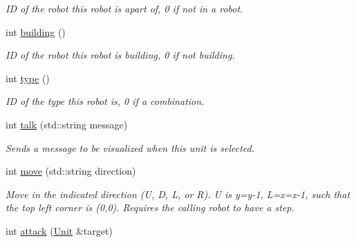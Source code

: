 \begin{DoxyCompactItemize}
\begin{DoxyCompactList}\small\item\em ID of the robot this robot is apart of, 0 if not in a robot. \item\end{DoxyCompactList}\item 
\hypertarget{classBot_a20891617ea241884bf1cd3642914a660}{
int \hyperlink{classBot_a20891617ea241884bf1cd3642914a660}{building} ()}
\label{classBot_a20891617ea241884bf1cd3642914a660}

\begin{DoxyCompactList}\small\item\em ID of the robot this robot is building, 0 if not building. \item\end{DoxyCompactList}\item 
\hypertarget{classBot_a85dc8bb8e995c5c40468225ccaa5ebbd}{
int \hyperlink{classBot_a85dc8bb8e995c5c40468225ccaa5ebbd}{type} ()}
\label{classBot_a85dc8bb8e995c5c40468225ccaa5ebbd}

\begin{DoxyCompactList}\small\item\em ID of the type this robot is, 0 if a combination. \item\end{DoxyCompactList}\item 
\hypertarget{classBot_a168f5c58ade8b9fc6dc88340b046e314}{
int \hyperlink{classBot_a168f5c58ade8b9fc6dc88340b046e314}{talk} (std::string message)}
\label{classBot_a168f5c58ade8b9fc6dc88340b046e314}

\begin{DoxyCompactList}\small\item\em Sends a message to be visualized when this unit is selected. \item\end{DoxyCompactList}\item 
\hypertarget{classBot_a15d55cdd01ddcf65b0f84a9e74f35ffa}{
int \hyperlink{classBot_a15d55cdd01ddcf65b0f84a9e74f35ffa}{move} (std::string direction)}
\label{classBot_a15d55cdd01ddcf65b0f84a9e74f35ffa}

\begin{DoxyCompactList}\small\item\em Move in the indicated direction (U, D, L, or R). U is y=y-\/1, L=x=x-\/1, such that the top left corner is (0,0). Requires the calling robot to have a step. \item\end{DoxyCompactList}\item 
\hypertarget{classBot_af877960466913d96dc12b7363b70fb38}{
int \hyperlink{classBot_af877960466913d96dc12b7363b70fb38}{attack} (\hyperlink{classUnit}{Unit} \&target)}
\label{classBot_af877960466913d96dc12b7363b70fb38}


\end{DoxyCompactItemize}
